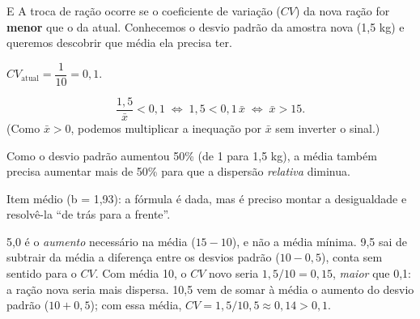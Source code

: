 \begin{resolucao}{E}
 A troca de ração ocorre se o coeficiente de variação ($CV$) da nova
ração for \textbf{menor} que o da atual. Conhecemos o desvio padrão da amostra nova (1,5 kg) e queremos
descobrir que média ela precisa ter.

 $CV_{\text{atual}} = \dfrac{1}{10} = 0{,}1$.

\[ \frac{1{,}5}{\bar{x}} < 0{,}1 \;\Longleftrightarrow\; 1{,}5 < 0{,}1\,\bar{x} \;\Longleftrightarrow\; \bar{x} > 15. \]
(Como $\bar{x} > 0$, podemos multiplicar a inequação por $\bar{x}$ sem inverter o sinal.)

 Como o desvio padrão aumentou 50\% (de 1 para 1,5 kg), a média também precisa
aumentar mais de 50\% para que a dispersão \emph{relativa} diminua.


Item médio (b = 1,93): a fórmula é dada, mas é preciso montar a desigualdade e resolvê-la “de trás
para a frente”.

\begin{distratores}
 5,0 é o \emph{aumento} necessário na média ($15 - 10$), e não a média mínima.
 9,5 sai de subtrair da média a diferença entre os desvios padrão ($10 - 0{,}5$), conta sem
sentido para o $CV$.
 Com média 10, o $CV$ novo seria $1{,}5/10 = 0{,}15$, \emph{maior} que 0,1: a ração nova seria
mais dispersa.
 10,5 vem de somar à média o aumento do desvio padrão ($10 + 0{,}5$); com essa média,
$CV = 1{,}5/10{,}5 \approx 0{,}14 > 0{,}1$.
\end{distratores}
\end{resolucao}

